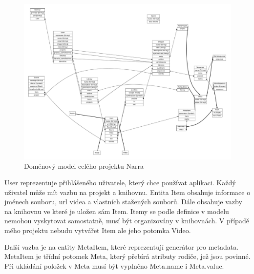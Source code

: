 \begin{figure}[H]
\includegraphics[width=1\textwidth]{./obrazova_priloha/domain_full.pdf}
\caption{Doménový model celého projektu Narra}
\end{figure}

\par User reprezentuje přihlášeného uživatele, který chce používat aplikaci. Každý uživatel může mít vazbu na projekt a knihovnu. Entita Item obsahuje informace o jménech souboru, url videa a vlastních stažených souborů. Dále obsahuje vazby na knihovnu ve které je uložen sám Item. Itemy se podle definice v modelu nemohou vyskytovat samostatně, musí být organizovány v knihovnách. V případě mého projektu nebudu vytvářet Item ale jeho potomka Video. 
\par Další vazba je na entity MetaItem, které reprezentují generátor pro metadata. MetaItem je třídní potomek Meta, který přebírá atributy rodiče, jež jsou povinné. Při ukládání položek v Meta musí být vyplněno Meta.name i Meta.value.

